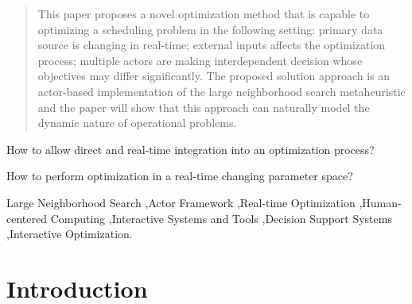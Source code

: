 \documentclass[preprint,12pt,authoryear]{elsarticle}
\begin{document}
\begin{frontmatter}
\begin{abstract}
This paper proposes a novel optimization method that is capable to optimizing a scheduling problem in the following setting: 
primary data source is changing in real-time; external inputs affects the optimization process; multiple actors
are making interdependent decision whose objectives may differ significantly. The proposed solution approach is an actor-based implementation
of the large neighborhood search metaheuristic and the paper will show that this approach can naturally model the dynamic nature of operational problems.
\end{abstract}

\begin{graphicalabstract}
\end{graphicalabstract}

\begin{highlights}
\item How to allow direct and real-time integration into an optimization process?
\item How to perform optimization in a real-time changing parameter space?
\end{highlights}

\begin{keyword}
Large Neighborhood Search \sep Actor Framework \sep Real-time Optimization \sep Human-centered Computing \sep Interactive Systems and Tools \sep Decision Support Systems \sep Interactive Optimization.




\end{keyword}

\end{frontmatter}



\section{Introduction}
\label{sec:1-introduction}
\end{document}
